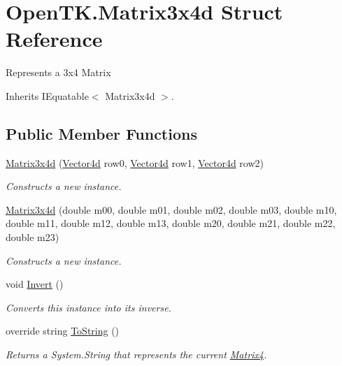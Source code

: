 \hypertarget{struct_open_t_k_1_1_matrix3x4d}{\section{Open\-T\-K.\-Matrix3x4d Struct Reference}
\label{struct_open_t_k_1_1_matrix3x4d}
}


Represents a 3x4 Matrix  




Inherits I\-Equatable$<$ Matrix3x4d $>$.

\subsection*{Public Member Functions}
\begin{DoxyCompactItemize}
\item 
\hyperlink{struct_open_t_k_1_1_matrix3x4d_a158472998f517e486487c0c541318d22}{Matrix3x4d} (\hyperlink{struct_open_t_k_1_1_vector4d}{Vector4d} row0, \hyperlink{struct_open_t_k_1_1_vector4d}{Vector4d} row1, \hyperlink{struct_open_t_k_1_1_vector4d}{Vector4d} row2)
\begin{DoxyCompactList}\small\item\em Constructs a new instance. \end{DoxyCompactList}\item 
\hyperlink{struct_open_t_k_1_1_matrix3x4d_ad6f97a437695790c89ab4f51774a5f6b}{Matrix3x4d} (double m00, double m01, double m02, double m03, double m10, double m11, double m12, double m13, double m20, double m21, double m22, double m23)
\begin{DoxyCompactList}\small\item\em Constructs a new instance. \end{DoxyCompactList}\item 
void \hyperlink{struct_open_t_k_1_1_matrix3x4d_ad974dafb3f4683f18e4053545a37bc6e}{Invert} ()
\begin{DoxyCompactList}\small\item\em Converts this instance into its inverse. \end{DoxyCompactList}\item 
override string \hyperlink{struct_open_t_k_1_1_matrix3x4d_a626a366b3d4c50678948dcf5b32f8c38}{To\-String} ()
\begin{DoxyCompactList}\small\item\em Returns a System.\-String that represents the current \hyperlink{struct_open_t_k_1_1_matrix4}{Matrix4}. \end{DoxyCompactList}\item 

\end{DoxyCompactItemize}

